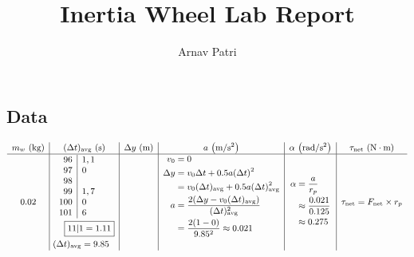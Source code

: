 \documentclass[12pt, A4]{article}
\title{Inertia Wheel Lab Report}
\author{Arnav Patri}
\newcommand{\avg}[1]{#1_{\mathrm{avg}}}
\newcommand{\net}[1]{#1_{\mathrm{net}}}
\begin{document}
	\maketitle
	
		\subsection*{Data}
			\[\small\begin{array}{c|c|c|c|c|c}
				m_w\text{ (kg)} & \avg{(\Delta t)}\text{ (s)} & \Delta y\text{ (m)} & a \text{ }\mathrm{\left(m/s^2\right)} & \alpha \text{ } \mathrm{\left(rad/s^2\right)} & \net{\tau} \text{ } \mathrm{(N\cdot m)} \\\hline
				0.02 & 
					\begin{aligned}
						&\begin{array}{r|l}
							96 & 1, 1\\
							97 & 0 \\
							98 \\
							99 & 1, 7 \\
							100 & 0 \\
							101 & 6
							\end{array} \\
						&\hspace{3.7mm}\boxed{11|1 = 1.11} \\
						&\hspace{-0.5mm}\avg{(\Delta t)} = 9.85
					\end{aligned} &
					\multirow{30}{*}{1} &
					\begin{aligned}
						v_0 &= 0 \\
						\Delta y &= v_0\Delta t + 0.5a(\Delta t)^2 \\
						 &= v_0\avg{(\Delta t)} + 0.5a\avg{(\Delta t)}^2 \\
						 a &= \frac{2(\Delta y - v_0\avg{(\Delta t)})}{\avg{(\Delta t)}^2} \\
						 	&= \frac{2(1 - 0)}{9.85^2} \approx 0.021 \\
						 	\\[0.1mm]
					\end{aligned} &
					\begin{aligned}
						\alpha &= \frac{a}{r_p} \\
							&\approx \frac{0.021}{0.125} \\
							&\approx 0.275
					\end{aligned} &
					\begin{aligned}
						\net{\tau} &= \net{F}\times r_p \\

\end{aligned}
\end{array}\]
\end{document}
